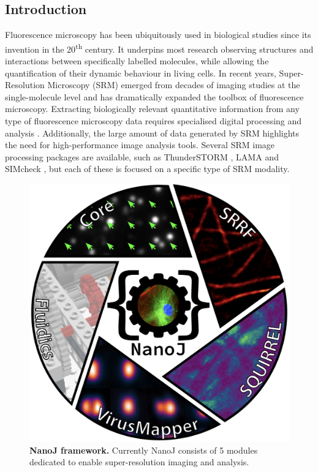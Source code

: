 \subsection*{Introduction}
 Fluorescence microscopy has been ubiquitously used in biological studies since its invention in the 20\textsuperscript{th} century. It underpins most research observing structures and interactions between specifically labelled molecules, while allowing the quantification of their dynamic behaviour in living cells. In recent years, Super-Resolution Microscopy (SRM) \cite{betzig2006imaging,rust2006sub,hell1994breaking} emerged from decades of imaging studies at the single-molecule level and has dramatically expanded the toolbox of fluorescence microscopy. Extracting biologically relevant quantitative information from any type of fluorescence microscopy data requires specialised digital processing and analysis \cite{wheeler2017standard}. Additionally, the large amount of data generated by SRM highlights the need for high-performance image analysis tools.  Several SRM image processing packages are available, such as ThunderSTORM \cite{ovesny2014thunderstorm}, LAMA \cite{Malkusch2016LAMA} and SIMcheck \cite{schermelleh2015simcheck}, but each of these is focused on a specific type of SRM modality.
  
 \begin{figure}[!t]
    \centering
    \includegraphics[width=\linewidth]{Figures/FigureMain_v3.png}
    \caption{\textbf{NanoJ framework.} Currently NanoJ consists of 5 modules dedicated to enable super-resolution imaging and analysis.}
    \label{fig:GeneralDiagram}
 \end{figure}
 
